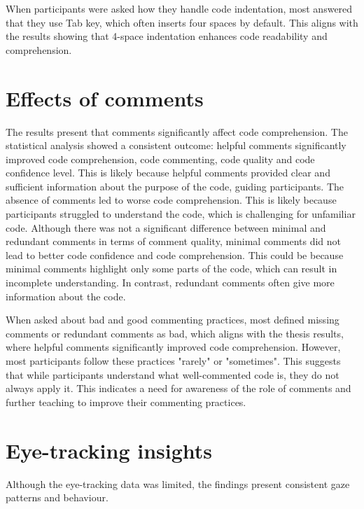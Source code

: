 When participants were asked how they handle code indentation, most answered that they use Tab key, which often inserts four spaces by default.  This aligns with the results showing that 4-space indentation enhances code readability and comprehension. 

\section{Effects of comments} 
The results present that comments significantly affect code comprehension. The statistical analysis showed a consistent outcome: helpful comments significantly improved code comprehension, code commenting, code quality and code confidence level. This is likely because helpful comments provided clear and sufficient information about the purpose of the code, guiding participants. The absence of comments led to worse code comprehension. This is likely because participants struggled to understand the code, which is challenging for unfamiliar code. Although there was not a significant difference between minimal and redundant comments in terms of comment quality, minimal comments did not lead to better code confidence and code comprehension. This could be because minimal comments highlight only some parts of the code,  which can result in incomplete understanding. In contrast, redundant comments often give more information about the code.   
 

When asked about bad and good commenting practices, most defined missing comments or redundant comments as bad, which aligns with the thesis results, where helpful comments significantly improved code comprehension. However, most participants follow these practices "rarely" or "sometimes". This suggests that while participants understand what well-commented code is, they do not always apply it. This indicates a need for awareness of the role of comments and further teaching to improve their commenting practices.  



\section{Eye-tracking insights} 
Although the eye-tracking data was limited, the findings present consistent gaze patterns and behaviour. 

